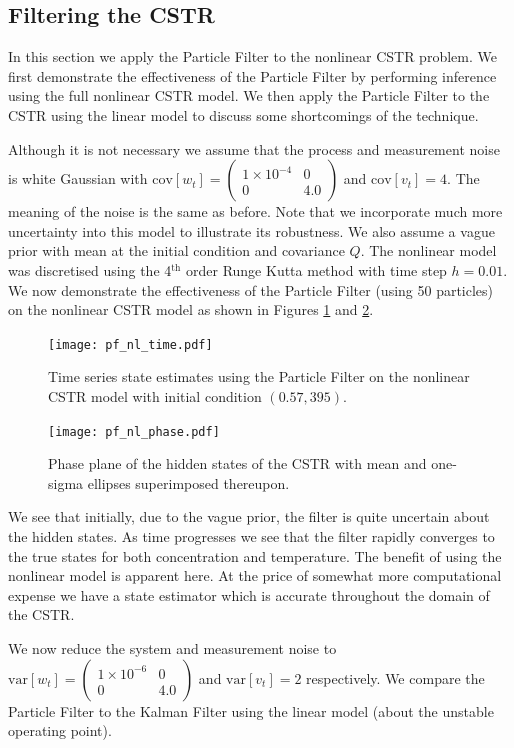 \documentclass[../masters.tex]{subfiles}
\begin{document}
\subsection{Filtering the CSTR}
In this section we apply the Particle Filter to the nonlinear CSTR problem. We first demonstrate the effectiveness of the Particle Filter by performing inference using the full nonlinear CSTR model. We then apply the Particle Filter to the CSTR using the linear model to discuss some shortcomings of the technique.

Although it is not necessary we assume that the process and measurement noise is white Gaussian with $\text{cov}[w_t] = \begin{pmatrix}
1\times 10^{-4} & 0 \\ 0 & 4.0 
\end{pmatrix}$ and $\text{cov}[v_t] = 4$. The meaning of the noise is the same as before. Note that we incorporate much more uncertainty into this model to illustrate its robustness. We also assume a vague prior with mean at the initial condition and covariance $Q$. The nonlinear model was discretised using the 4$^{\text{th}}$ order Runge Kutta method \cite{edwardsandpenny} with time step $h=0.01$. We now demonstrate the effectiveness of the Particle Filter (using 50 particles) on the nonlinear CSTR model as shown in Figures \ref{fig_pfnltime} and \ref{fig_pfnlphase}.
\begin{figure}[H] 
\centering
\texttt{[image: pf\_nl\_time.pdf]}
\caption{Time series state estimates using the Particle Filter on the nonlinear CSTR model with initial condition $(0.57, 395)$.}
\label{fig_pfnltime}
\end{figure}
\begin{figure}[H] 
\centering
\texttt{[image: pf\_nl\_phase.pdf]}
\caption{Phase plane of the hidden states of the CSTR with mean and one-sigma ellipses superimposed thereupon.}
\label{fig_pfnlphase}
\end{figure}
We see that initially, due to the vague prior, the filter is quite uncertain about the hidden states. As time progresses we see that the filter rapidly converges to the true states for both concentration and temperature. The benefit of using the nonlinear model is apparent here. At the price of somewhat more computational expense we have a state estimator which is accurate throughout the domain of the CSTR.

We now reduce the system and measurement noise to $\text{var}[w_t] = \begin{pmatrix}
1\times 10^{-6} & 0 \\ 0 & 4.0 
\end{pmatrix}$  and  $\text{var}[v_t] = 2$ respectively. We compare the Particle Filter to the Kalman Filter using the linear model (about the unstable operating point). 



\end{document}
